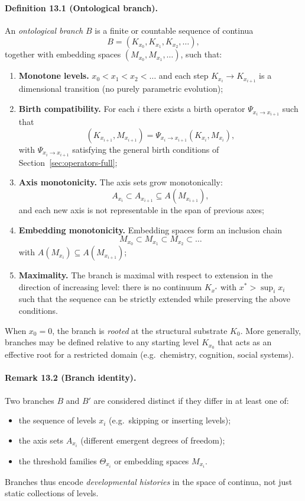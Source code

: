 \paragraph{Definition 13.1 (Ontological branch).}
An \emph{ontological branch} \(B\) is a finite or countable sequence of continua
\[
  B = (K_{x_0}, K_{x_1}, K_{x_2}, \dots),
\]
together with embedding spaces \((M_{x_0}, M_{x_1}, \dots)\), such that:
\begin{enumerate}
  \item \textbf{Monotone levels.}\quad
        \(x_0 < x_1 < x_2 < \dots\) and each step
        \(K_{x_i} \to K_{x_{i+1}}\) is a dimensional transition
        (no purely parametric evolution);
  \item \textbf{Birth compatibility.}\quad
        For each \(i\) there exists a birth operator
        \(\Psi_{x_i\to x_{i+1}}\) such that
        \[
          (K_{x_{i+1}}, M_{x_{i+1}}) =
            \Psi_{x_i\to x_{i+1}}(K_{x_i}, M_{x_i}),
        \]
        with \(\Psi_{x_i\to x_{i+1}}\) satisfying the general birth
        conditions of Section~\ref{sec:operators-full};
  \item \textbf{Axis monotonicity.}\quad
        The axis sets grow monotonically:
        \[
          A_{x_i} \subset A_{x_{i+1}}
          \subseteq A(M_{x_{i+1}}),
        \]
        and each new axis is not representable in the span of previous axes;
  \item \textbf{Embedding monotonicity.}\quad
        Embedding spaces form an inclusion chain
        \[
          M_{x_0} \subset M_{x_1} \subset M_{x_2} \subset \dots
        \]
        with \(A(M_{x_i}) \subseteq A(M_{x_{i+1}})\);
  \item \textbf{Maximality.}\quad
        The branch is maximal with respect to extension in the direction
        of increasing level: there is no continuum \(K_{x^{\ast}}\) with
        \(x^{\ast} > \sup_i x_i\) such that the sequence can be strictly
        extended while preserving the above conditions.
\end{enumerate}

When \(x_0 = 0\), the branch is \emph{rooted} at the structural substrate
\(K_0\). More generally, branches may be defined relative to any starting level
\(K_{x_0}\) that acts as an effective root for a restricted domain
(e.g.\ chemistry, cognition, social systems).

\paragraph{Remark 13.2 (Branch identity).}
Two branches \(B\) and \(B'\) are considered distinct if they differ in at
least one of:
\begin{itemize}
  \item the sequence of levels \(x_i\) (e.g.\ skipping or inserting levels);
  \item the axis sets \(A_{x_i}\) (different emergent degrees of freedom);
  \item the threshold families \(\Theta_{x_i}\) or embedding spaces \(M_{x_i}\).
\end{itemize}
Branches thus encode \emph{developmental histories} in the space of continua,
not just static collections of levels.

